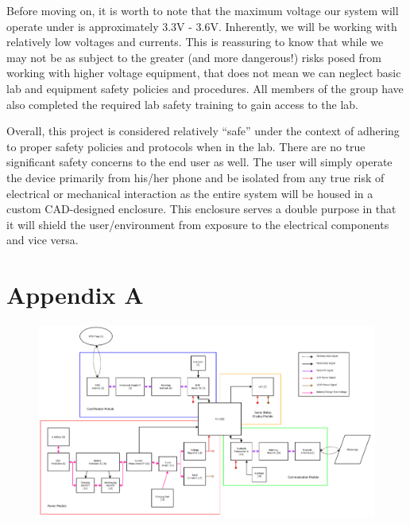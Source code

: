 \documentclass[12pt]{article}
\begin{document}
Before moving on, it is worth to note that the maximum voltage our system will operate under is approximately 3.3V - 3.6V. Inherently, we will be working with relatively low voltages and currents. This is reassuring to know that while we may not be as subject to the greater (and more dangerous!) risks posed from working with higher voltage equipment, that does not mean we can neglect basic lab and equipment safety policies and procedures. All members of the group have also completed the required lab safety training to gain access to the lab. 

Overall, this project is considered relatively ``safe'' under the context of adhering to proper safety policies and protocols when in the lab. There are no true significant safety concerns to the end user as well. The user will simply operate the device primarily from his/her phone and be isolated from any true risk of electrical or mechanical interaction as the entire system will be housed in a custom CAD-designed enclosure. This enclosure serves a double purpose in that it will shield the user/environment from exposure to the electrical components and vice versa. 




\newpage
\section{Appendix A}

\begin{figure}[h!]
	\centering
	\includegraphics[height=0.93\textheight]{Full_Block_Diagram_v4.png}
\end{figure}
\end{document}
